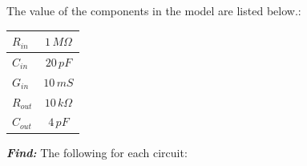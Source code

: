 \documentclass[12pt, fleqn]{article}
\begin{document}
The value of the components in the model are listed below.:

    \begin{table}[H]
    \centering
    \setlength{\tabcolsep}{20pt}
    \renewcommand{\arraystretch}{1.5}
        \begin{tabular}{|l|c|}
            \hline
            $R_{in}$ & $1\,M \Omega$\\
            \hline
            $C_{in}$ & $20\,pF$\\
            \hline
            $G_{in}$ & $10\,mS$\\
            \hline
            $R_{out}$ & $10\,k \Omega$\\
            \hline
            $C_{out}$ & $4\,pF$\\
            \hline
        \end{tabular}
    \end{table}

\noindent
\textbf{\emph{Find: }} The following for each circuit:
\end{document}
